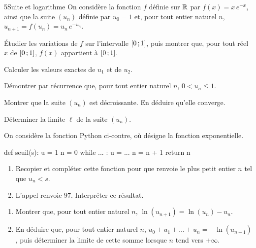 \begin{exoBac}{5}{Suite et logarithme}
On considère la fonction $f$ définie sur $\mathbb{R}$ par $f(x)=x\,e^{-x}$, ainsi que la suite $(u_n)$ définie par $u_0=1$ et, pour tout entier
naturel $n$, $u_{n+1}=f(u_n)=u_n\,e^{-u_n}$.
\begin{questions}
  \item Étudier les variations de $f$ sur l'intervalle $\mathopen{[}0\,{;}\,1\mathclose{]}$, puis montrer que, pour tout réel $x$ de $\mathopen{[}0\,{;}\,1\mathclose{]}$, $f(x)$
    appartient à $\mathopen{[}0\,{;}\,1\mathclose{]}$.
\end{questions}
\begin{questions}[resume]
  \item Calculer les valeurs exactes de $u_1$ et de $u_2$.
  \item Démontrer par récurrence que, pour tout entier naturel $n$, $0<u_n\leq1$.
  \item Montrer que la suite $(u_n)$ est décroissante. En déduire qu'elle converge.
  \item Déterminer la limite $\ell$ de la suite $(u_n)$.
  \item On considère la fonction Python ci-contre, où  désigne la fonction exponentielle.
\begin{codecote}[0.46]
\begin{pythoncol}
def seuil(s):
    u = 1
    n = 0
    while ... :
        u = ...
        n = n + 1
    return n
\end{pythoncol}
\cote
\begin{enumerate}[label=\alph*),leftmargin=1.4em,itemsep=0.6mm,topsep=0mm]
  \item Recopier et compléter cette fonction pour que  renvoie le plus petit entier $n$ tel que $u_n<s$.
  \item L'appel  renvoie $97$. Interpréter ce résultat.
\end{enumerate}
\end{codecote}
  \item \begin{enumerate}[label=\alph*),leftmargin=1.4em,itemsep=0.4mm,topsep=0.4mm]
      \item Montrer que, pour tout entier naturel $n$, $\ln(u_{n+1})=\ln(u_n)-u_n$.
      \item En déduire que, pour tout entier naturel $n$, $u_0+u_1+\dots+u_n=-\ln(u_{n+1})$, puis déterminer la limite de cette somme
        lorsque $n$ tend vers $+\infty$.
    \end{enumerate}
\end{questions}
\end{exoBac}

